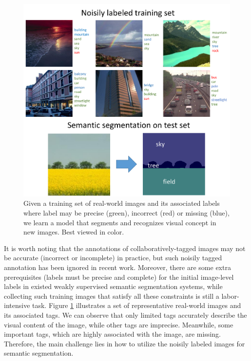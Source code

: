 \begin{figure}[t]
\begin{center}
    \includegraphics[width=1\linewidth]{noisyparsing.pdf}
\end{center}
    \caption{Given a training set of real-world images and its associated labels where label may be precise (green), incorrect (red) or missing (blue), we learn a model that segments and recognizes visual concept in new images. Best viewed in color.}
\label{fig:noisylabel}
\end{figure}

It is worth noting that the annotations of collaboratively-tagged images may not be accurate (incorrect or incomplete) in practice, but such noisily tagged annotation has been ignored in recent work. Moreover, there are some extra prerequisites (\eg labels must be precise and complete) for the initial image-level labels in existed weakly supervised semantic segmentation systems, while collecting such training images that satisfy all these constraints is still a labor-intensive task. Figure \ref{fig:noisylabel} illustrates a set of representative real-world images and its associated tags. We can observe that only limited tags accurately describe the visual content of the image, while other tags are imprecise. Meanwhile, some important tags, which are highly associated with the image, are missing. Therefore, the main challenge lies in how to utilize the noisily labeled images for semantic segmentation.

